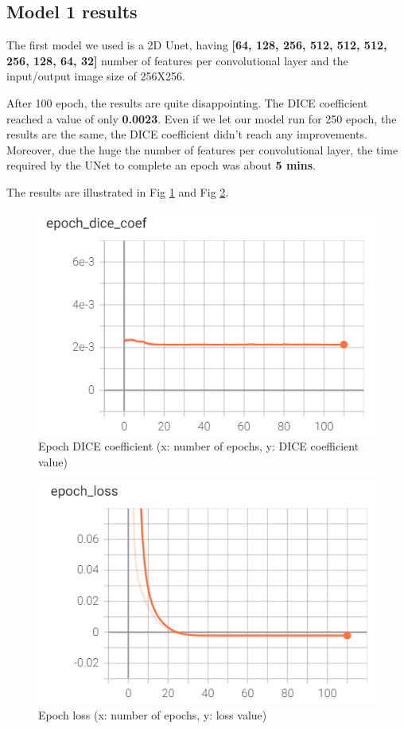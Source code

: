 \documentclass[runningheads,a4paper,11pt]{report}
\begin{document}
\subsection{Model 1 results}
\label{section:unet1_results}

The first model we used is a 2D Unet, having \textbf{[64, 128, 256, 512, 512, 512, 256, 128, 64, 32]} number of features per convolutional layer and the input/output image size of 256X256.\par
After 100 epoch, the results are quite disappointing. The DICE coefficient reached a value of only \textbf{0.0023}. Even if we let our model run for 250 epoch, the results are the same, the DICE coefficient didn't reach any improvements. Moreover, due the huge the number of features per convolutional layer, the time required by the UNet to complete an epoch was about \textbf{5 mins}.\par
The results are illustrated in Fig \ref{epoch_dice_coef_model1} and Fig \ref{epoch_loss_model1}.

\begin{figure}[!h]
	\centerline{\includegraphics{images/epoch_dice_coef_model1.PNG}}  
	\caption{Epoch DICE coefficient (x: number of epochs, y: DICE coefficient value)}
	\label{epoch_dice_coef_model1}
\end{figure}

\begin{figure}[!h]
	\centerline{\includegraphics{images/epoch_loss_model1.PNG}}
	\caption{Epoch loss (x: number of epochs, y: loss value)}
	\label{epoch_loss_model1}
\end{figure}
\end{document}
